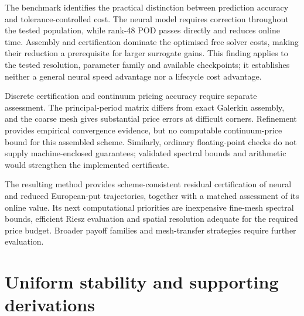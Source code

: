 \documentclass[11pt]{amsart}
\theoremstyle{remark}
\begin{document}
The benchmark identifies the practical distinction between prediction
accuracy and tolerance-controlled cost. The neural model requires
correction throughout the tested population, while rank-48 POD passes
directly and reduces online time. Assembly and certification dominate the
optimised free solver costs, making their reduction a prerequisite for
larger surrogate gains. This finding applies to the tested resolution,
parameter family and available checkpoints; it establishes neither a
general neural speed advantage nor a lifecycle cost advantage.

Discrete certification and continuum pricing accuracy require separate
assessment. The principal-period matrix differs from exact Galerkin
assembly, and the coarse mesh gives substantial price errors at difficult
corners. Refinement provides empirical convergence evidence, but no
computable continuum-price bound for this assembled scheme. Similarly,
ordinary floating-point checks do not supply machine-enclosed guarantees;
validated spectral bounds and arithmetic would strengthen the implemented
certificate.

The resulting method provides scheme-consistent residual certification of
neural and reduced European-put trajectories, together with a matched
assessment of its online value. Its next computational priorities are
inexpensive fine-mesh spectral bounds, efficient Riesz evaluation and
spatial resolution adequate for the required price budget. Broader payoff
families and mesh-transfer strategies require further evaluation.
\FloatBarrier
\appendix
\section{Uniform stability and supporting derivations}
\label{app:proofs}
\end{document}
